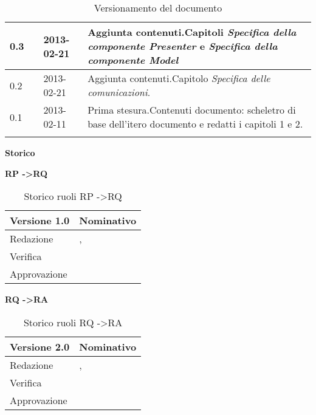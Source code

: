 \begin{longtable}{p{} p{} p{} p{}}
\midrule
0.3	&	\DC &	2013-02-21	&	Aggiunta contenuti.\newline Capitoli \textit{Specifica della componente Presenter} e \textit{Specifica della componente Model}\\
\midrule
0.2	&	\DC &	2013-02-21	&	Aggiunta contenuti.\newline Capitolo \textit{Specifica delle comunicazioni}.\\
\midrule
0.1	&	\DC &	2013-02-11	&	Prima stesura.\newline Contenuti documento: scheletro di base dell'itero documento e redatti i capitoli 1 e 2.\\
\bottomrule
	\caption{Versionamento del documento}
	\end{longtable}

\newpage

\Large{\textbf{Storico }}\\
\normalsize

\textbf{RP -\textgreater RQ}
\\
\begin{table}[h]
\begin{center}

\begin{tabular}{p{} p{}}
\toprule
\textbf{Versione 1.0}	&	\textbf{Nominativo}\\
\midrule
\midrule
Redazione	&	\MB , \DC \\
\midrule
Verifica &	\EZ	\\
\midrule
Approvazione	&	\VP	\\
\bottomrule
\end{tabular}
\caption{Storico ruoli RP -\textgreater RQ}
\label{tabVers1}
\end{center}
\end{table}



\textbf{RQ -\textgreater RA}
\\
\begin{table}[h]
\begin{center}

\begin{tabular}{p{} p{}}
\toprule
\textbf{Versione 2.0}	&	\textbf{Nominativo}\\
\midrule
\midrule
Redazione	&	\VP , \FZ \\
\midrule
Verifica &	\SL	\\
\midrule
Approvazione	&	\MB	\\
\bottomrule
\end{tabular}
\caption{Storico ruoli RQ -\textgreater RA}
\label{tabVers2}
\end{center}
\end{table}